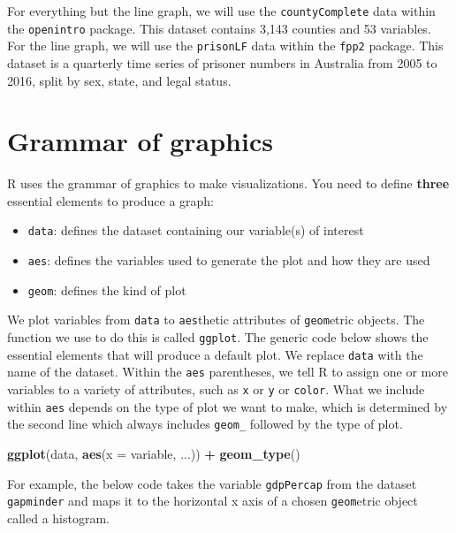 \documentclass[
]{book}
\newenvironment{Shaded}{\begin{snugshade}}{\end{snugshade}}
\newcommand{\DataTypeTok}[1]{\textcolor[rgb]{0.13,0.29,0.53}{#1}}
\newcommand{\KeywordTok}[1]{\textcolor[rgb]{0.13,0.29,0.53}{\textbf{#1}}}
\newcommand{\NormalTok}[1]{#1}
\newcommand{\OperatorTok}[1]{\textcolor[rgb]{0.81,0.36,0.00}{\textbf{#1}}}
\newcommand{\StringTok}[1]{\textcolor[rgb]{0.31,0.60,0.02}{#1}}
\providecommand{\tightlist}{%
  \setlength{\itemsep}{0pt}\setlength{\parskip}{0pt}}
\begin{document}
For everything but the line graph, we will use the \texttt{countyComplete} data within the \texttt{openintro} package. This dataset contains 3,143 counties and 53 variables. For the line graph, we will use the \texttt{prisonLF} data within the \texttt{fpp2} package. This dataset is a quarterly time series of prisoner numbers in Australia from 2005 to 2016, split by sex, state, and legal status.

\hypertarget{grammar-of-graphics}{%
\section{Grammar of graphics}\label{grammar-of-graphics}}

R uses the grammar of graphics to make visualizations. You need to define \textbf{three} essential elements to produce a graph:

\begin{itemize}
\tightlist
\item
  \texttt{data}: defines the dataset containing our variable(s) of interest
\item
  \texttt{aes}: defines the variables used to generate the plot and how they are used
\item
  \texttt{geom}: defines the kind of plot
\end{itemize}

We plot variables from \texttt{data} to \texttt{aes}thetic attributes of \texttt{geom}etric objects. The function we use to do this is called \texttt{ggplot}. The generic code below shows the essential elements that will produce a default plot. We replace \texttt{data} with the name of the dataset. Within the \texttt{aes} parentheses, we tell R to assign one or more variables to a variety of attributes, such as \texttt{x} or \texttt{y} or \texttt{color}. What we include within \texttt{aes} depends on the type of plot we want to make, which is determined by the second line which always includes \texttt{geom\_} followed by the type of plot.

\begin{Shaded}
\begin{Highlighting}[]
\KeywordTok{ggplot}\NormalTok{(data, }\KeywordTok{aes}\NormalTok{(}\DataTypeTok{x =}\NormalTok{ variable, ...)) }\OperatorTok{+}
\StringTok{  }\KeywordTok{geom_type}\NormalTok{()}
\end{Highlighting}
\end{Shaded}

For example, the below code takes the variable \texttt{gdpPercap} from the dataset \texttt{gapminder} and maps it to the horizontal x axis of a chosen \texttt{geom}etric object called a histogram.
\end{document}
